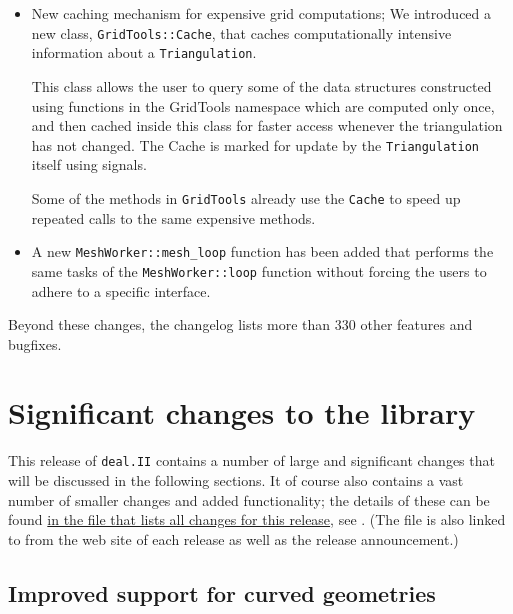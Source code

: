 \documentclass{ansarticle-preprint}
\newcommand{\specialword}[1]{\texttt{#1}}
\newcommand{\dealii}{{\specialword{deal.II}}\xspace}
\begin{document}
\begin{itemize}
\item New caching mechanism for expensive grid computations; We introduced a new
  class, \texttt{GridTools::Cache}, that caches computationally intensive
  information about a \texttt{Triangulation}.

This class allows the user to query some of the data structures constructed
using functions in the GridTools namespace which are computed only once, and
then cached inside this class for faster access whenever the triangulation has
not changed. The Cache is marked for update by the \texttt{Triangulation} itself
using signals.

Some of the methods in \texttt{GridTools} already use the \texttt{Cache} to
speed up repeated calls to the same expensive methods.
\item A new \texttt{MeshWorker::mesh\_loop} function has been added that
  performs the same tasks of the \texttt{MeshWorker::loop} function without
  forcing the users to adhere to a specific interface.

\end{itemize}
Beyond these changes, the changelog lists more than 330 other features and bugfixes.




\section{Significant changes to the library}

This release of \dealii contains a number of large and significant changes
that will be discussed in the following sections. It of course also contains a
vast number of smaller changes and added functionality; the details of these
can be found
\href{https://www.dealii.org/developer/doxygen/deal.II/changes_between_8_5_and_9_0.html}{
in the file that lists all changes for this release}, see \cite{changes90}.
(The file is also linked to from the web site of each release as well as
the release announcement.)

\subsection{Improved support for curved geometries}
\label{sec:manifolds}
\end{document}
